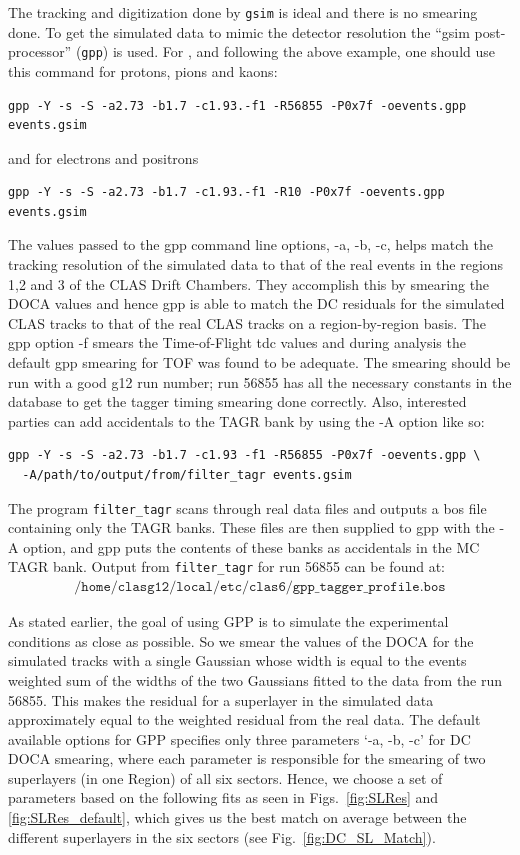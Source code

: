 The tracking and digitization done by \texttt{gsim} is ideal and there is no smearing done. To get the simulated data to mimic the detector resolution the ``gsim post-processor'' (\texttt{gpp}) is used. For , and following the above example, one should use this command for protons, pions and kaons:
\begin{verbatim}
gpp -Y -s -S -a2.73 -b1.7 -c1.93.-f1 -R56855 -P0x7f -oevents.gpp events.gsim
\end{verbatim}
and for electrons and positrons
\begin{verbatim}
gpp -Y -s -S -a2.73 -b1.7 -c1.93.-f1 -R10 -P0x7f -oevents.gpp events.gsim
\end{verbatim}
The values passed to the gpp command line options, -a, -b, -c, helps match the tracking resolution of the simulated data to that of the real events in the regions 1,2 and 3 of the CLAS Drift Chambers. They accomplish this by smearing the DOCA values and hence gpp is able to match the DC residuals for the simulated CLAS tracks to that of the real CLAS tracks on a region-by-region basis. The gpp option -f smears the Time-of-Flight tdc values and during analysis the default gpp smearing for TOF was found to be adequate. The smearing should be run with a good g12 run number; run 56855 has all the necessary constants in the database to get the tagger timing smearing done correctly. Also, interested parties can add accidentals to the TAGR bank by using the -A option like so:
\label{cmd:gppAoption}\begin{verbatim}
gpp -Y -s -S -a2.73 -b1.7 -c1.93 -f1 -R56855 -P0x7f -oevents.gpp \
  -A/path/to/output/from/filter_tagr events.gsim
\end{verbatim}
The program \texttt{filter\_tagr} scans through real data files and outputs a bos file containing only the TAGR banks. These files are then supplied to gpp with the -A option, and gpp puts the contents of these banks as accidentals in the MC TAGR bank. Output from \texttt{filter\_tagr} for run 56855 can be found at:
\begin{align}
    \texttt{/home/clasg12/local/etc/clas6/gpp\_tagger\_profile.bos} \nonumber
\end{align}


As stated earlier, the goal of using GPP is to simulate the experimental conditions as close as possible. So we smear the values of the DOCA for the simulated tracks with a single Gaussian whose width is equal to the events weighted sum of the widths of the two Gaussians fitted to the data from the run 56855. This makes the residual for a superlayer in the simulated data approximately equal to the weighted residual from the real data. The default available options for GPP specifies only three parameters `-a, -b, -c' for DC DOCA smearing, where each parameter is responsible for the smearing of two superlayers (in one Region) of all six sectors. Hence, we choose a set of parameters based on the following fits as seen in Figs.~\ref{fig:SLRes} and \ref{fig:SLRes_default}, which gives us the best match on average between the different superlayers in the six sectors (see Fig.~\ref{fig:DC_SL_Match}).

